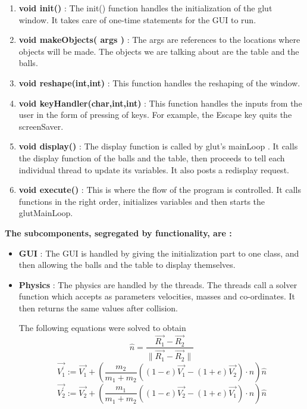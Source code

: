 \documentclass[]{article}
\begin{document}
\begin{itemize}
\begin{flushleft}
\begin{enumerate}
\item \textbf{void init()} : The init() function handles the initialization of the glut window. It takes care of one-time statements for the GUI to run.

\item \textbf{void makeObjects( args )} : The args are references to the locations where objects will be made. The objects we are talking about are the table and the balls. 

\item \textbf{void reshape(int,int)} : This function handles the reshaping of the window.

\item \textbf{void keyHandler(char,int,int)} : This function handles the inputs from the user in the form of pressing of keys. For example, the Escape key quits the screenSaver.

\item \textbf{void display()} : The display function is called by glut's mainLoop . It calls the display function of the balls and the table, then proceeds to tell each individual thread to update its variables. It also posts a redisplay request.

\item \textbf{void execute()} : This is where the flow of the program is controlled. It calls functions in the right order, initializes variables and then starts the glutMainLoop.

\end{enumerate}


\textbf{The subcomponents, segregated by functionality, are :}

\begin{itemize}

\item \textbf{GUI} : The GUI is handled by giving the initialization part to one class, and then allowing the balls and the table to display themselves.

\item \textbf{Physics} : The physics are handled by the threads. The threads call a solver function which accepts as parameters velocities, masses and co-ordinates. It then returns the same values after collision.

The following equations were solved to obtain 
\begin{equation}
\hat{n} = \frac{\vec{R_{1}} - \vec{R_{2}}}{ \parallel \vec{R_{1}} - \vec{R_{2}} \parallel}
\end{equation}
\begin{equation}
\vec{V_{1}^{'}} := \vec{V_{1}} + (\frac{m_{2}}{m_{1} + m_{2}}((1-e)\vec{V_{1}} - (1+e)\vec{V_{2}})\cdotp\hat{n})\hat{n}
\end{equation}
\begin{equation}
\vec{V_{2}^{'}} := \vec{V_{2}} + (\frac{m_{1}}{m_{1} + m_{2}}((1-e)\vec{V_{2}} - (1+e)\vec{V_{1}})\cdotp\hat{n})\hat{n}
\end{equation}



\end{itemize}
\end{flushleft}
\end{itemize}
\end{document}
